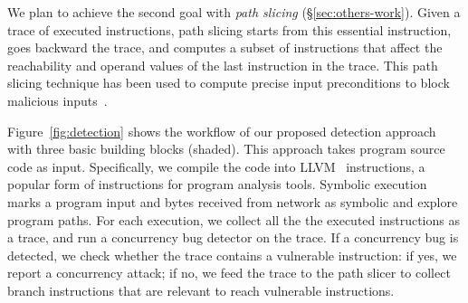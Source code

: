We plan to achieve the second goal with \emph{path slicing} 
(\S\ref{sec:others-work}). Given a trace of executed instructions, path slicing 
starts from this essential instruction, goes backward the trace, and computes a 
subset of instructions that affect the reachability and operand 
values of the last instruction in the trace. This path slicing technique has 
been used to compute precise input preconditions to block malicious 
inputs~\cite{castro:bouncer}.

Figure~\ref{fig:detection} shows the workflow of our proposed
detection approach with three basic building blocks (shaded). This approach takes 
program source code as input. Specifically, we compile the code into 
LLVM~\cite{llvm} instructions, a popular form of instructions for program 
analysis tools. Symbolic execution marks a program input and bytes 
received from network as symbolic and explore program paths. For each execution, 
we collect all the the executed instructions as a trace, and run a concurrency 
bug detector on the trace. If a concurrency bug is detected, we check whether the trace 
contains a vulnerable instruction: if yes, we report a concurrency attack; if 
no, we feed the trace to the path slicer to collect branch instructions that 
are relevant to reach vulnerable instructions.



% 


